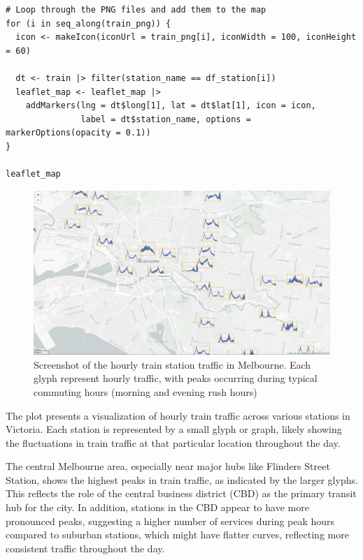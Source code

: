 \begin{verbatim}
# Loop through the PNG files and add them to the map
for (i in seq_along(train_png)) {
  icon <- makeIcon(iconUrl = train_png[i], iconWidth = 100, iconHeight = 60)

  dt <- train |> filter(station_name == df_station[i])
  leaflet_map <- leaflet_map |>
    addMarkers(lng = dt$long[1], lat = dt$lat[1], icon = icon,
               label = dt$station_name, options = markerOptions(opacity = 0.1))
}

leaflet_map
\end{verbatim}

\begin{figure}
\includegraphics[width=26.31in]{figures/leaflet} \caption{Screenshot of the hourly train station traffic in Melbourne. Each glyph represent hourly traffic, with peaks occurring during typical commuting hours (morning and evening rush hours)}\label{fig:unnamed-chunk-20}
\end{figure}

The plot presents a visualization of hourly train traffic across various stations in Victoria. Each station is represented by a small glyph or graph, likely showing the fluctuations in train traffic at that particular location throughout the day.

The central Melbourne area, especially near major hubs like Flinders Street Station, shows the highest peaks in train traffic, as indicated by the larger glyphs. This reflects the role of the central business district (CBD) as the primary transit hub for the city. In addition, stations in the CBD appear to have more pronounced peaks, suggesting a higher number of services during peak hours compared to suburban stations, which might have flatter curves, reflecting more consistent traffic throughout the day.

